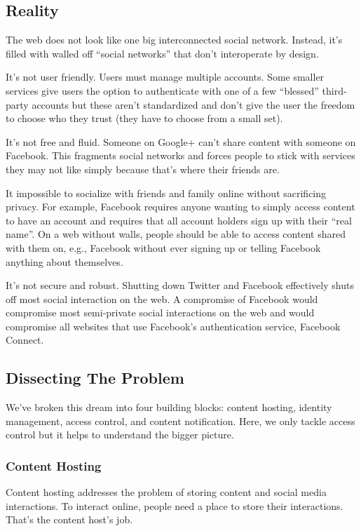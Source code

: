 \documentclass[pdftex,12pt,a4papaer,twoside,notitlepage]{report}
\begin{document}
\subsection{Reality}

The web does not look like one big interconnected social network. Instead, it's
filled with walled off ``social networks'' that don't interoperate by design.

It's not user friendly. Users must manage multiple accounts. Some smaller
services give users the option to authenticate with one of a few ``blessed''
third-party accounts but these aren't standardized and don't give the user the
freedom to choose who they trust (they have to choose from a small set).

It's not free and fluid. Someone on Google+ can't share content with someone on
Facebook. This fragments social networks and forces people to stick with
services they may not like simply because that's where their friends are.

It impossible to socialize with friends and family online without sacrificing
privacy. For example, Facebook requires anyone wanting to simply access content
to have an account and requires that all account holders sign up with their ``real
name''. On a web without walls, people should be able to access content shared
with them on, e.g., Facebook without ever signing up or telling Facebook
anything about themselves.

It's not secure and robust. Shutting down Twitter and Facebook effectively shuts
off most social interaction on the web. A compromise of Facebook would
compromise most semi-private social interactions on the web and would compromise
all websites that use Facebook's authentication service, Facebook Connect.

\subsection{Dissecting The Problem}

We've broken this dream into four building blocks: content hosting, identity
management, access control, and content notification. Here, we only tackle
access control but it helps to understand the bigger picture.

\subsubsection{Content Hosting}

Content hosting addresses the problem of storing content and social media
interactions. To interact online, people need a place to store their
interactions. That's the content host's job.
\end{document}
